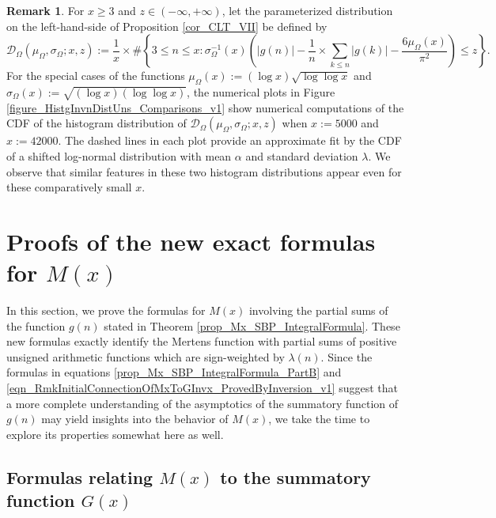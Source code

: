 \documentclass[11pt,reqno,a4letter]{article}
\newcommand{\hlocalref}[1]{\hyperref[#1]{\ref{#1}}}
\numberwithin{equation}{section}
\numberwithin{figure}{section}
\numberwithin{table}{section}
\theoremstyle{plain}
\numberwithin{theorem}{section}
\theoremstyle{definition}
\newtheorem{remark}[theorem]{Remark}
\begin{document}
\begin{remark}
For $x \geq 3$ and $z \in (-\infty, +\infty)$, let the parameterized distribution 
on the left-hand-side of Proposition \hlocalref{cor_CLT_VII} be defined by 
\[
\mathcal{D}_{\Omega}\left(\mu_{\Omega}, \sigma_{\Omega}; x, z\right) := 
     \frac{1}{x} \times \#\left\{3 \leq n \leq x: 
     \sigma_{\Omega}^{-1}(x) \left(|g(n)| - \frac{1}{n} \times \sum_{k \leq n} |g(k)| - 
     \frac{6\mu_{\Omega}(x)}{\pi^2}\right) \leq z\right\}. 
\]
For the special cases of the functions $\mu_{\Omega}(x) := (\log x)\sqrt{\log\log x}$ and 
$\sigma_{\Omega}(x) := \sqrt{(\log x) (\log\log x)}$, the numerical plots in 
Figure \hlocalref{figure_HistgInvnDistUns_Comparisons_v1} 
show numerical computations of the CDF of the histogram distribution of 
$\mathcal{D}_{\Omega}\left(\mu_{\Omega}, \sigma_{\Omega}; x, z\right)$ when 
$x := 5000$ and $x := 42000$. 
The dashed lines in each plot provide an approximate fit by the CDF 
of a shifted log-normal distribution with mean $\alpha$ and standard deviation $\lambda$. 
We observe that similar features in these two histogram distributions appear even for these 
comparatively small $x$. 
\end{remark}

\section{Proofs of the new exact formulas for $M(x)$} 
\label{Section_KeyApplications} 
\label{Section_KeyApplications_NewExactFormulasForMx_FullSectionLabel} 

In this section, we prove the formulas for $M(x)$ involving the partial sums 
of the function $g(n)$ stated in 
Theorem \hlocalref{prop_Mx_SBP_IntegralFormula}. 
These new formulas exactly identify the Mertens function with partial sums of 
positive unsigned arithmetic functions which are sign-weighted by $\lambda(n)$. 
Since the formulas in equations 
\eqref{prop_Mx_SBP_IntegralFormula_PartB} and 
\eqref{eqn_RmkInitialConnectionOfMxToGInvx_ProvedByInversion_v1} 
suggest that a more complete understanding of the 
asymptotics of the summatory function of $g(n)$ may yield insights into the behavior of 
$M(x)$, we take the time to explore its properties somewhat here as well. 

\subsection{Formulas relating $M(x)$ to the summatory function $G(x)$} 
\label{subSection_KeyApplications_NewExactFormulasForMx} 
\end{document}
